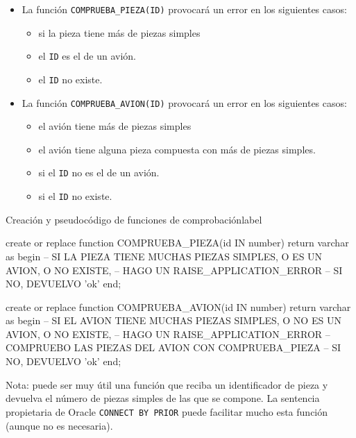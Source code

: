 \needspace{.15\textheight}
\begin{homeworkProblem}
  \begin{itemize}

  \item La función \texttt{COMPRUEBA\_PIEZA(ID)} provocará un error en los siguientes casos:
    \begin{itemize}
    \item si la pieza tiene más de {\maximopiezaspieza} piezas simples
    \item el \texttt{ID} es el de un avión.
    \item el \texttt{ID} no existe.
    \end{itemize}

  \item La función \texttt{COMPRUEBA\_AVION(ID)} provocará un error en los siguientes casos:
    \begin{itemize}
    \item el avión tiene más de {\maximopiezasavion} piezas simples
    \item el avión tiene alguna pieza compuesta con más de {\maximopiezaspieza} piezas simples.  
    \item si el \texttt{ID} no es el de un avión.
    \item si el \texttt{ID} no existe.  
    \end{itemize}
  \end{itemize}

  
\begin{listadosql}{Creación y pseudocódigo de funciones de comprobación}{label}

create or replace function COMPRUEBA_PIEZA(id IN number) return varchar 
as
begin
  -- SI LA PIEZA TIENE MUCHAS PIEZAS SIMPLES, O ES UN AVION, O NO EXISTE,
  --   HAGO UN RAISE_APPLICATION_ERROR
  -- SI NO, DEVUELVO 'ok'
end; 

create or replace function COMPRUEBA_AVION(id IN number) return varchar 
as
begin
  -- SI EL AVION TIENE MUCHAS PIEZAS SIMPLES, O NO ES UN AVION, O NO EXISTE, 
  --   HAGO UN RAISE_APPLICATION_ERROR
  -- COMPRUEBO LAS PIEZAS DEL AVION CON COMPRUEBA_PIEZA
  -- SI NO, DEVUELVO 'ok'
end; 

\end{listadosql}

    Nota: puede ser muy útil una función que reciba un identificador de pieza y devuelva el número de piezas simples de las que se compone. La sentencia propietaria de Oracle \texttt{CONNECT BY PRIOR} puede facilitar mucho esta función (aunque no es necesaria).


\end{homeworkProblem}


